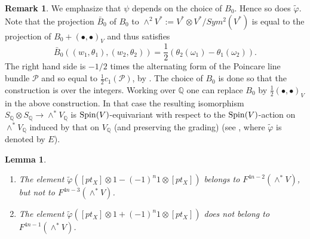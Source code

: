 \documentclass[12pt]{amsart}
\numberwithin{equation}{subsection}
\theoremstyle{plain}
\newtheorem{lem}[thm]{Lemma}
\theoremstyle{definition}
\newtheorem{rem}[thm]{Remark}
\newcommand{\QQ}{{\mathbb Q}}
\renewcommand{\P}{{\mathcal P}}
\newcommand{\Spin}{{\rm Spin}}
\begin{document}
 \begin{rem}
 \label{remark-non-equivariance-of-varphi-tilde}
 We emphasize that $\psi$ depends on the choice of $B_0$. Hence so does $\tilde{\varphi}$.
 Note that the projection $\bar{B}_0$ of $B_0$ to $\wedge^2 V^*:=V^*\otimes V^*/Sym^2(V^*)$ is equal to the projection of $B_0+(\bullet,\bullet)_V$ and thus satisfies 
 \[
 \bar{B}_0((w_1,\theta_1),(w_2,\theta_2))=\frac{1}{2}(\theta_2(\omega_1)-\theta_1(\omega_2)).
 \]
 The right hand side is $-1/2$ times the alternating form of the Poincare line bundle $\P$ \cite[Th. 2.5.1]{BL} and so equal to $\frac{1}{2}c_1(\P)$,  by \cite[2.6 (2b)]{BL}. The choice of $B_0$ is done so that the construction is over the integers. Working over $\QQ$ one can replace $B_0$ by $\frac{1}{2}(\bullet,\bullet)_V$ in the above construction. In that case the resulting isomorphism $S_\QQ\otimes S_\QQ\rightarrow \wedge^*V_\QQ$ is $\Spin(V)$-equivariant with respect to the $\Spin(V)$-action on $\wedge^*V_\QQ$
 induced by that on $V_\QQ$ (and preserving the grading) (see \cite[Th. 1(i)]{trautman}, where $\tilde{\varphi}$ is denoted by $E$).
 \end{rem}
 
 
 \begin{lem}
 \label{lemma-symmetric-or-alternating-product-of-two-pure-spinors-has-weight-2}
 \begin{enumerate}
 \item
 \label{lemma-item-weight-4n-2}
 The element 
 $\tilde{\varphi}([pt_{X}]\otimes 1-(-1)^n1\otimes[pt_{X}])$ belongs to $F^{4n-2}(\wedge^*V)$, but not to 
 $F^{4n-3}(\wedge^*V)$.
 \item
 \label{lemma-item-weight-4n}
 The element 
 $\tilde{\varphi}([pt_{X}]\otimes 1+(-1)^n1\otimes[pt_{X}])$ does not belong to $F^{4n-1}(\wedge^*V)$.
 \end{enumerate}
 \end{lem}
 
\end{document}
